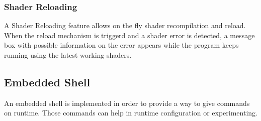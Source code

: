 \subsubsection{Shader Reloading}
A Shader Reloading feature allows on the fly shader recompilation and reload. When the reload
mechanism is triggerd and a shader error is detected, a message box with possible information on
the error appears while the program keeps running using the latest working shaders.

\subsection{Embedded Shell}
An embedded shell is implemented in order to provide a way to give commands on runtime. Those commands
can help in runtime configuration or experimenting.
